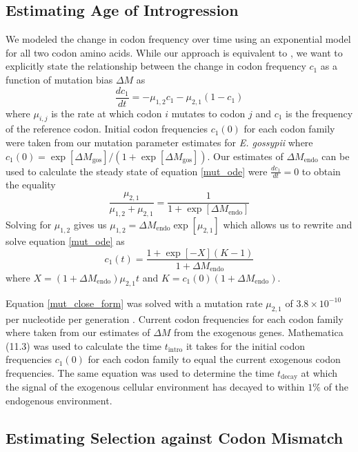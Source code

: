 \documentclass[doublespacing,linenumbers]{bmcart-modified}
\newcommand{\gossypii}{\textit{E. gossypii}\xspace}
\newcommand{\DM}{\ensuremath{{\Delta M}}\xspace}
\begin{document}
\subsection*{Estimating Age of Introgression}
We modeled the change in codon frequency over time using an exponential model for all two codon amino acids.
While our approach is equivalent to \cite{MaraisEtal2004}, we want to explicitly state the relationship between the change in codon frequency $c_1$ as a function of mutation bias \DM as
\begin{equation}
\frac{d c_1}{d t} = -\mu_{1,2}c_1 - \mu_{2,1}(1-c_1)
\label{mut_ode}
\end{equation}
where $\mu_{i,j}$ is the rate at which codon $i$ mutates to codon $j$ and $c_1$ is the frequency of the reference codon.
Initial codon frequencies $c_1(0)$ for each codon family were taken from our mutation parameter estimates for \gossypii where $c_1(0) = \exp[\DM_\text{gos}]/(1+\exp[\DM_\text{gos}])$. 
Our estimates of $\DM_\text{endo}$ can be used to calculate the steady state of equation \ref{mut_ode} were $\frac{d c_1}{d t} = 0$ to obtain the equality
\begin{equation}
\frac{\mu_{2,1}}{\mu_{1,2} + \mu_{2,1}} = \frac{1}{1+\exp[\DM_\text{endo}]}
\end{equation}
Solving for $\mu_{1,2}$ gives us $\mu_{1,2} = \DM_\text{endo}\exp[\mu_{2,1}]$ which allows us to rewrite and solve equation \ref{mut_ode} as
\begin{equation}
c_1(t) = \frac{ 1 + \exp[-X](K-1) }{ 1+\DM_\text{endo} }
\label{mut_close_form}
\end{equation}
where $X = (1+\DM_\text{endo})\mu_{2,1}t$ and $K = c_1(0)(1+\DM_\text{endo}) $.

Equation \ref{mut_close_form} was solved with a mutation rate $\mu_{2,1}$ of $3.8\times 10^{-10}$ per nucleotide per generation \citep{lang2008}. 
Current codon frequencies for each codon family where taken from our estimates of \DM from the exogenous genes.
Mathematica (11.3) \citep{Mathematica11} was used to calculate the time $t_\text{intro}$ it takes for the initial codon frequencies $c_1(0)$ for each codon family to equal the current exogenous codon frequencies.
The same equation was used to determine the time $t_\text{decay}$ at which the signal of the exogenous cellular environment has decayed to within $1 \%$ of the endogenous environment.

\subsection*{Estimating Selection against Codon Mismatch}
\end{document}
